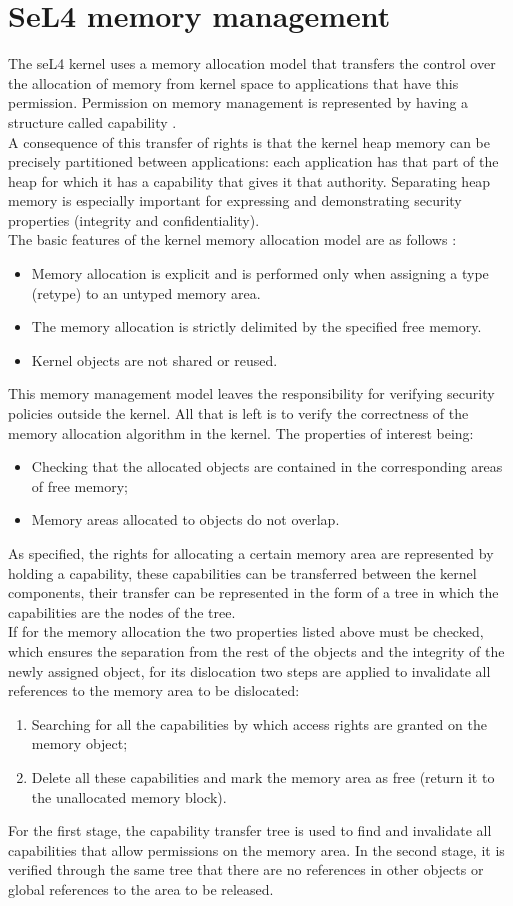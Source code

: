 \documentclass[conference]{IEEEtran}
\begin{document}
\section{SeL4 memory management}
The seL4 kernel uses a memory allocation model that transfers the control over the allocation of memory from kernel space to applications that have this permission. Permission on memory management is represented by having a structure called capability \cite{sel4-wp}.\\
A consequence of this transfer of rights is that the kernel heap memory can be precisely partitioned between applications: each application has that part of the heap for which it has a capability that gives it that authority. Separating heap memory is especially important for expressing and demonstrating security properties (integrity and confidentiality).\\
The basic features of the kernel memory allocation model are as follows \cite{verifos}:
\begin{itemize}
    \item Memory allocation is explicit and is performed only when assigning a type (retype) to an untyped memory area.
    \item The memory allocation is strictly delimited by the specified free memory.
    \item Kernel objects are not shared or reused.
\end{itemize}
This memory management model leaves the responsibility for verifying security policies outside the kernel. All that is left is to verify the correctness of the memory allocation algorithm in the kernel. The properties of interest being:
\begin{itemize}
    \item Checking that the allocated objects are contained in the corresponding areas of free memory;
    \item Memory areas allocated to objects do not overlap.
\end{itemize}
As specified, the rights for allocating a certain memory area are represented by holding a capability, these capabilities can be transferred between the kernel components, their transfer can be represented in the form of a tree in which the capabilities are the nodes of the tree.\\
If for the memory allocation the two properties listed above must be checked, which ensures the separation from the rest of the objects and the integrity of the newly assigned object, for its dislocation two steps are applied to invalidate all references to the memory area to be dislocated:
\begin{enumerate}
    \item Searching for all the capabilities by which access rights are granted on the memory object;
    \item Delete all these capabilities and mark the memory area as free (return it to the unallocated memory block).
\end{enumerate}
For the first stage, the capability transfer tree is used to find and invalidate all capabilities that allow permissions on the memory area. In the second stage, it is verified through the same tree that there are no references in other objects or global references to the area to be released.
\end{document}
